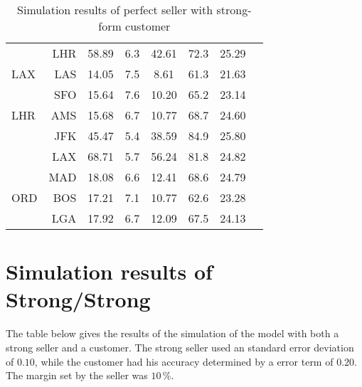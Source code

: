 \begin{table}[h]
\begin{center}
\begin{tabular}{l r c c c c c c}
     &  LHR &   58.89  &     6.3  &   42.61  &    72.3  &   25.29  \\[.5ex]
LAX  &  LAS &   14.05  &     7.5  &    8.61  &    61.3  &   21.63  \\
     &  SFO &   15.64  &     7.6  &   10.20  &    65.2  &   23.14  \\[.5ex]
LHR  &  AMS &   15.68  &     6.7  &   10.77  &    68.7  &   24.60  \\
     &  JFK &   45.47  &     5.4  &   38.59  &    84.9  &   25.80  \\
     &  LAX &   68.71  &     5.7  &   56.24  &    81.8  &   24.82  \\
     &  MAD &   18.08  &     6.6  &   12.41  &    68.6  &   24.79  \\[.5ex]
ORD  &  BOS &   17.21  &     7.1  &   10.77  &    62.6  &   23.28  \\
     &  LGA &   17.92  &     6.7  &   12.09  &    67.5  &   24.13  \\
            \bottomrule
        \end{tabular}
        \caption{Simulation results of perfect seller with strong-form customer}
        \label{tbl:resultsPerfectStrong}
    \end{center}
\end{table}



\chapter{Simulation results of Strong/Strong}
\label{app:SimulationResultsStrongStrong}
The table below gives the results of the simulation of the model with both a strong seller and a customer. The strong seller used an standard error deviation of $0.10$, while the customer had his accuracy determined by a error term of $0.20$. The margin set by the seller was $10\,\%$.

